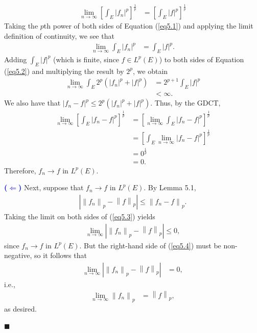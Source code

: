 \documentclass[12pt]{article}
\newcommand\norm[1]{\left\lVert#1\right\rVert}
\begin{document}
\begin{align}
\lim\limits_{n\rightarrow\infty}\left[\int_E |f_n|^p\right]^{\frac{1}{p}} &= \left[\int_E|f|^p\right]^{\frac{1}{p}} \label{eq5.1}
\end{align}
Taking the $p$th power of both sides of Equation (\ref{eq5.1}) and applying the limit definition of continuity, we see that
\begin{align}
    \lim\limits_{n\rightarrow\infty}\int_E|f_n|^p &= \int_E|f|^p. \label{eq5.2}
\end{align}
Adding $\int_E |f|^p$ (which is finite, since $f\in L^p(E)$) to both sides of Equation (\ref{eq5.2}) and multiplying the result by $2^p$, we obtain
\begin{align}
    \lim\limits_{n\rightarrow\infty} \int_E 2^p\left(|f_n|^p+|f|^p\right) &= 2^{p+1}\int_E |f|^p \\
    &< \infty.
\end{align}
We also have that $|f_n-f|^p \leq 2^p\left(|f_n|^p+|f|^p\right).$ Thus, by the GDCT, \begin{align}
    \lim\limits_{n\rightarrow\infty}\left[\int_E|f_n-f|^p\right]^\frac{1}{p} &= \left[\lim\limits_{n\rightarrow\infty}\int_E|f_n-f|^p\right]^\frac{1}{p} \\
    &= \left[\int_E\lim\limits_{n\rightarrow\infty}|f_n-f|^p\right]^\frac{1}{p} \\
    &= 0^{\frac{1}{p}} \\
    &= 0.
\end{align}
Therefore, $f_n\rightarrow f$ in $L^p(E).$

\vspace{5mm}

\noindent \textcolor{blue}{\textbf{($\Leftarrow$)}} Next, suppose that $f_n\rightarrow f$ in $L^p(E)$. By Lemma 5.1, 
\begin{align}
    \left|\norm{f_n}_p-\norm{f}_p\right| \leq \norm{f_n-f}_p. \label{eq5.3}
\end{align}
\noindent Taking the limit on both sides of (\ref{eq5.3}) yields
\begin{align}
    \lim\limits_{n\rightarrow\infty}\left|\norm{f_n}_p-\norm{f}_p\right| \leq 0 \label{eq5.4},
\end{align}
since $f_n\rightarrow f$ in $L^p(E)$. But the right-hand side of (\ref{eq5.4}) must be non-negative, so it follows that 
\begin{align}
    \lim\limits_{n\rightarrow\infty}\left|\norm{f_n}_p-\norm{f}_p\right| &= 0,
\end{align}
i.e.,
\begin{align}
    \lim\limits_{n\rightarrow\infty}\norm{f_n}_p &= \norm{f}_p,
\end{align}
as desired.

\hfill$\blacksquare$ 

\vfill

\begin{center}
\\
\vspace{2mm}
\vspace{-0.65cm}
\hrulefill \\
\vspace{-0.95cm}
\hrulefill
\end{center}
\end{document}
